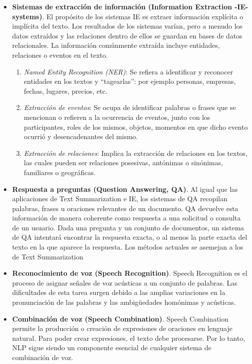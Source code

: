 \documentclass[12pt,a4paper]{article}
\begin{document}
\begin{sloppypar}
\begin{itemize}
\item \textbf{Sistemas de extracción de información (Information Extraction -IE- systems)}. El propósito de los sistemas IE es extraer información explícita o implícita del texto. Los resultados de los sistemas varían, pero a menudo los datos extraídos y las relaciones dentro de ellos se guardan en bases de datos relacionales. La información comúnmente extraída incluye entidades, relaciones o eventos en el texto. 

\begin{enumerate}
\item \textit{Named Entity Recognition (NER)}: Se refiera a identificar y reconocer entidades en los textos y “tagearlas”: por ejemplo personas, empresas, fechas, lugares, precios, etc.
\item \textit{Extracción de eventos}: Se ocupa de identificar palabras o frases que se mencionan o refieren a la ocurrencia de eventos, junto con los participantes, roles de los mismos, objetos, momentos en que dicho evento ocurrió y desencadenantes del mismo.
\item \textit{Extracción de relaciones}: Implica la extracción de relaciones en los textos, las cuales pueden ser relaciones posesivas, antónimas o sinónimas, familiares o geográficas.
\end{enumerate}

\item \textbf{Respuesta a preguntas (Question Answering, QA)}. Al igual que las aplicaciones de Text Summarization e IE, los sistemas de QA recopilan palabras, frases u oraciones relevantes de un documento. QA devuelve esta información de manera coherente como respuesta a una solicitud o consulta de un usuario. Dada una pregunta y un conjunto de documentos, un sistema de QA intentará encontrar la respuesta exacta, o al menos la parte exacta del texto en la que aparece la respuesta. Los métodos actuales se asemejan a los de Text Summarization

\item \textbf{Reconocimiento de voz (Speech Recognition)}. Speech Recognition es el proceso de asignar señales de voz acústicas a un conjunto de palabras. Las dificultades de esta tarea surgen debido a las amplias variaciones en la pronunciación de las palabras y las ambigüedades homónimas y acústicas.

\item \textbf{Combinación de voz (Speech Combination)}. Speech Combination permite la producción o creación de expresiones de oraciones en lenguaje natural. Para poder crear expresiones, el texto debe procesarse. Por lo tanto, NLP sigue siendo un componente esencial de cualquier sistema de combinación de voz.


\end{itemize}
\end{sloppypar}
\end{document}

